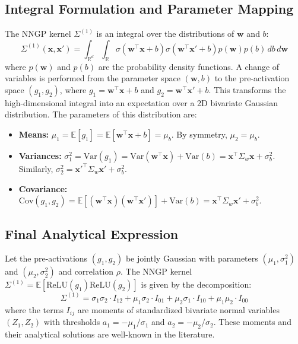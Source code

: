 \documentclass[12pt]{article}
\begin{document}
\subsection{Integral Formulation and Parameter Mapping}
The NNGP kernel $\Sigma^{(1)}$ is an integral over the distributions of $\bm{w}$ and $b$:
\begin{equation}
    \Sigma^{(1)}(\bm{x}, \bm{x}') = \int_{\mathbb{R}^d} \int_{\mathbb{R}} \sigma(\bm{w}^\top \bm{x} + b)\sigma(\bm{w}^\top \bm{x}' + b) p(\bm{w})p(b) \,db \,d\bm{w}
\end{equation}
where $p(\bm{w})$ and $p(b)$ are the probability density functions. A change of variables is performed from the parameter space $(\bm{w}, b)$ to the pre-activation space $(g_1, g_2)$, where $g_1 = \bm{w}^\top \bm{x} + b$ and $g_2 = \bm{w}^\top \bm{x}' + b$. This transforms the high-dimensional integral into an expectation over a 2D bivariate Gaussian distribution. The parameters of this distribution are:
\begin{itemize}
    \item \textbf{Means:} $\mu_1 = \mathbb{E}[g_1] = \mathbb{E}[\bm{w}^\top\bm{x} + b] = \mu_b$. By symmetry, $\mu_2 = \mu_b$.
    \item \textbf{Variances:} $\sigma_1^2 = \text{Var}(g_1) = \text{Var}(\bm{w}^\top\bm{x}) + \text{Var}(b) = \bm{x}^\top \Sigma_w \bm{x} + \sigma_b^2$. Similarly, $\sigma_2^2 = {\bm{x}'}^\top \Sigma_w \bm{x}' + \sigma_b^2$.
    \item \textbf{Covariance:} $\text{Cov}(g_1, g_2) = \mathbb{E}[(\bm{w}^\top\bm{x})(\bm{w}^\top\bm{x}')] + \text{Var}(b) = \bm{x}^\top \Sigma_w \bm{x}' + \sigma_b^2$.
\end{itemize}

\subsection{Final Analytical Expression}
\begin{theorem}
Let the pre-activations $(g_1, g_2)$ be jointly Gaussian with parameters $(\mu_1, \sigma_1^2)$ and $(\mu_2, \sigma_2^2)$ and correlation $\rho$. The NNGP kernel $\Sigma^{(1)} = \mathbb{E}[\text{ReLU}(g_1)\text{ReLU}(g_2)]$ is given by the decomposition:
\begin{equation}
\label{eq:final_ntk_decomp}
\boxed{
\Sigma^{(1)} = \sigma_1\sigma_2 \cdot I_{12} + \mu_1\sigma_2 \cdot I_{01} + \mu_2\sigma_1 \cdot I_{10} + \mu_1\mu_2 \cdot I_{00}
}
\end{equation}
where the terms $I_{ij}$ are moments of standardized bivariate normal variables $(Z_1, Z_2)$ with thresholds $a_1 = -\mu_1/\sigma_1$ and $a_2 = -\mu_2/\sigma_2$. These moments and their analytical solutions are well-known in the literature.
\end{theorem}
\end{document}
